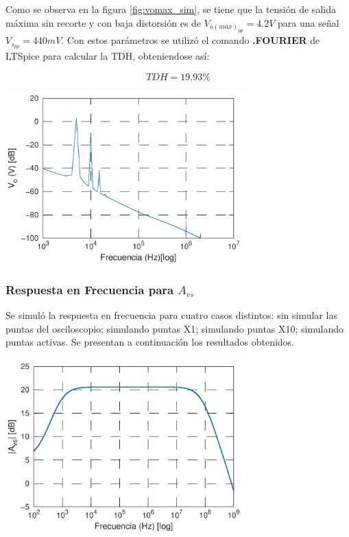 \documentclass[a4paper, 10pt, spanish]{article}
\begin{document}
Como se observa en la figura \ref{fig:vomax_sim}, se tiene que la tensión de salida máxima sin recorte y con baja distorsión es de $V_{o(max)_{pp}}=4.2V$ para una señal $V_{s_{pp}}=440mV$. Con estos parámetros se utilizó el comando \textbf{.FOURIER} de LTSpice para calcular la TDH, obteniendose así:

\begin{equation}
  TDH=19.93\%
\end{equation}

\begin{center}
  \includegraphics[width=0.7\textwidth]{fft_out.png}
  \label{fig:fft_sim}
\end{center}

\subsubsection{Respuesta en Frecuencia para $A_{vs}$}

Se simuló la respuesta en frecuencia para cuatro casos distintos: sin simular las puntas del osciloscopio; simulando puntas X1; simulando puntas X10; simulando puntas activas. Se presentan a continuación los resultados obtenidos.

\begin{center}
  \includegraphics[width=0.7\textwidth]{sim_sin_bode.png}
  \label{fig:sim-sin}
\end{center}
\end{document}
